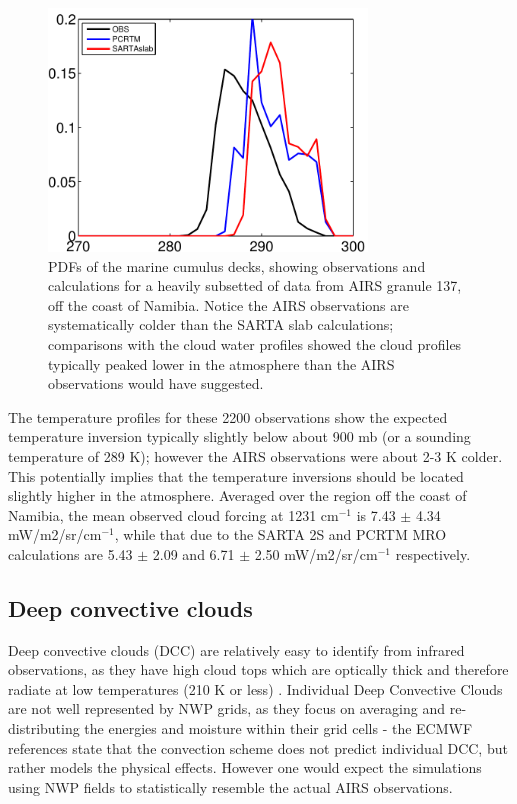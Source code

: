 \documentclass[agupp]{aguplus}              %
\newcommand{\wn}{cm$^{-1}$\xspace}
\begin{document}
\begin{article}
\begin{figure}[h]
\noindent\includegraphics[width=20pc]{FIGS/ecm_cloudBT1231_gev_marine_zoom}
\caption{PDFs of the marine cumulus decks, showing observations and
calculations for a heavily subsetted of data from AIRS granule 137,
off the coast of Namibia. Notice the AIRS observations are
systematically colder than the SARTA slab calculations; comparisons
with the cloud water profiles showed the cloud profiles typically
peaked lower in the atmosphere than the AIRS observations would have
suggested.}
\label{marine_pdf_zoom} 
\end{figure}

The temperature profiles for these 2200 observations
show the expected temperature inversion typically slightly below
about 900 mb (or a sounding temperature of 289 K); however the AIRS
observations were about 2-3 K colder. This potentially implies that
the temperature inversions should be located slightly higher in the
atmosphere. Averaged over the region off the coast of Namibia, the
mean observed cloud forcing at 1231 \wn is 7.43 $\pm$ 4.34
mW/m2/sr/\wn, while that due to the SARTA 2S and PCRTM MRO
calculations are 5.43 $\pm$ 2.09 and 6.71 $\pm$ 2.50 mW/m2/sr/\wn
respectively. 

\subsection{Deep convective clouds}

Deep convective clouds (DCC) are relatively easy to identify from
infrared observations, as they have high cloud tops which are
optically thick and therefore radiate at low temperatures (210 K or
less) \citep{aum:11}. Individual Deep Convective Clouds are not well
represented by NWP grids, as they focus on averaging and
re-distributing the energies and moisture within their grid cells -
the ECMWF references state that the convection scheme does not predict
individual DCC, but rather models the physical effects. However one
would expect the simulations using NWP fields to statistically
resemble the actual AIRS observations.


\end{article}
\end{document}
